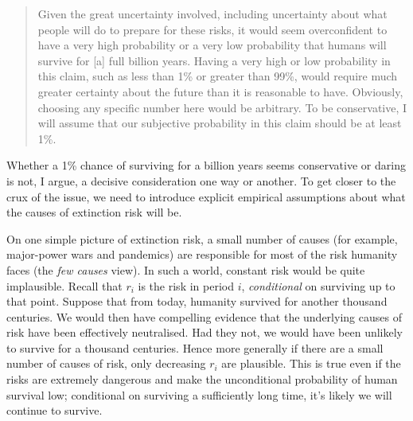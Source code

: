 \documentclass[british]{article}
\begin{document}
\begin{quote}
Given the great uncertainty involved, including uncertainty about what people will do to prepare for these risks, it would seem overconfident to have a very high probability or a very low probability that humans will survive for [a] full billion years. Having a very high or low probability in this claim, such as less than 1\% or greater than 99\%, would require much greater certainty about the future than it is reasonable to have. Obviously, choosing any specific number here would be arbitrary. To be conservative, I will assume that our subjective probability in this claim should be at least 1\%.
\end{quote}

Whether a 1\% chance of surviving for a billion years seems conservative or daring is not, I argue, a decisive consideration one way or another. To get closer to the crux of the issue, we need to introduce explicit empirical assumptions about what the causes of extinction risk will be.

On one simple picture of extinction risk, a small number of causes (for example, major-power wars and pandemics) are responsible for most of the risk humanity faces (the \emph{few causes} view).  In such a world, constant risk would be quite implausible. Recall that $r_i$ is the risk in period $i$, \emph{conditional} on surviving up to that point. Suppose that from today, humanity survived for another thousand centuries. We would then have compelling evidence that the underlying causes of risk have been effectively neutralised. Had they not, we would have been unlikely to survive for a thousand centuries. Hence more generally if there are a small number of causes of risk, only decreasing $r_i$ are plausible. This is true even if the risks are extremely dangerous and make the unconditional probability of human survival low; conditional on surviving a sufficiently long time, it's likely we will continue to survive.
\end{document}

